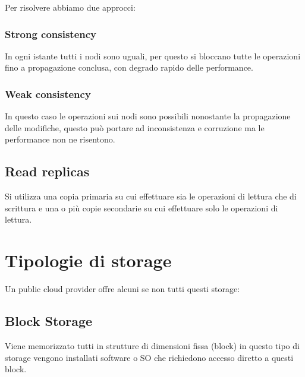 \documentclass[
]{article}
\begin{document}
{Per risolvere abbiamo due approcci:}

\subsubsection{\texorpdfstring{{Strong
consistency}}{Strong consistency}}\label{h.ldxh5fqezegb}

{In ogni istante tutti i nodi sono uguali, per questo si bloccano tutte
le operazioni fino a propagazione conclusa, con degrado rapido delle
performance.}

\subsubsection{\texorpdfstring{{Weak
consistency}}{Weak consistency}}\label{h.1k85zznzkf9t}

{In questo caso le operazioni sui nodi sono possibili nonostante la
propagazione delle modifiche, questo può portare ad inconsistenza e
corruzione ma le performance non ne risentono.}

{}

\subsection{\texorpdfstring{{Read
replicas}}{Read replicas}}\label{h.5ledo7sne0rx}

{Si utilizza una copia primaria su cui effettuare sia le operazioni di
lettura che di scrittura e una o più copie secondarie su cui effettuare
solo le operazioni di lettura.}

{}

\section{\texorpdfstring{{Tipologie di
storage}}{Tipologie di storage}}\label{h.mj3sf1rv45bx}

{Un public cloud provider offre alcuni se non tutti questi storage:}

{}

\subsection{\texorpdfstring{{Block
Storage}}{Block Storage}}\label{h.6q25hzblffb8}

{Viene memorizzato tutti in strutture di dimensioni fissa (block) in
questo tipo di storage vengono installati software o SO che richiedono
accesso diretto a questi block.}
\end{document}
